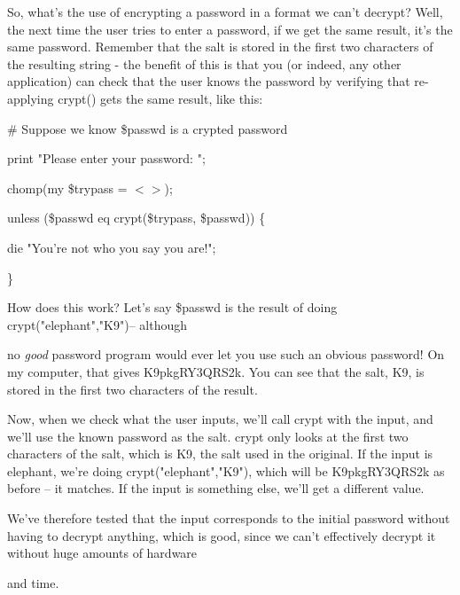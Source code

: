 \documentclass[a4paper,11pt]{book}
\begin{document}
\noindent 

\noindent So, what's the use of encrypting a password in a format we can't decrypt? Well, the next time the user tries to enter a password, if we get the same result, it's the same password. Remember that the salt is stored in the first two characters of the resulting string - the benefit of this is that you (or indeed, any other application) can check that the user knows the password by verifying that re-applying crypt() gets the same result, like this:

\noindent 

\noindent 

\noindent \# Suppose we know \$passwd is a crypted password

\noindent print "Please enter your password: ";

\noindent chomp(my \$trypass = $<$$>$);

\noindent 

\noindent unless (\$passwd eq crypt(\$trypass, \$passwd)) \{

\noindent die "You're not who you say you are!";

\noindent \}

\noindent 

\noindent How does this work? Let's say \$passwd is the result of doing crypt("elephant","K9")-- although

\noindent no \textit{good }password program would ever let you use such an obvious password! On my computer, that gives K9pkgRY3QRS2k. You can see that the salt, K9, is stored in the first two characters of the result.

\noindent 

\noindent Now, when we check what the user inputs, we'll call crypt with the input, and we'll use the known password as the salt. crypt only looks at the first two characters of the salt, which is K9, the salt used in the original. If the input is elephant, we're doing crypt("elephant","K9"), which will be K9pkgRY3QRS2k as before -- it matches. If the input is something else, we'll get a different value.

\noindent 

\noindent We've  therefore tested that the  input  corresponds  to  the  initial  password  without  having  to  decrypt anything,  which  is good,  since  we can't  effectively  decrypt  it  without  huge  amounts  of  hardware

\noindent and time.

\noindent 
\end{document}

